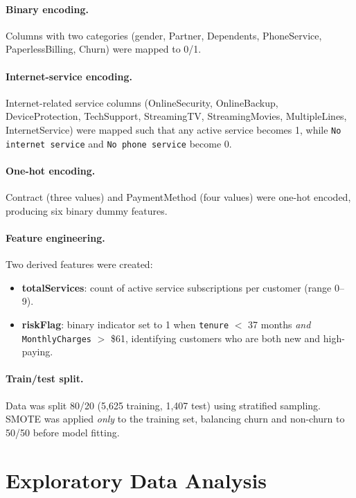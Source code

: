 \documentclass{article}
\begin{document}
\paragraph{Binary encoding.}
Columns with two categories (gender, Partner, Dependents, PhoneService,
PaperlessBilling, Churn) were mapped to 0/1.

\paragraph{Internet-service encoding.}
Internet-related service columns (OnlineSecurity, OnlineBackup,
DeviceProtection, TechSupport, StreamingTV, StreamingMovies, MultipleLines,
InternetService) were mapped such that any active service becomes 1, while
\texttt{No internet service} and \texttt{No phone service} become 0.

\paragraph{One-hot encoding.}
Contract (three values) and PaymentMethod (four values) were one-hot encoded,
producing six binary dummy features.

\paragraph{Feature engineering.}
Two derived features were created:
\begin{itemize}
  \item \textbf{totalServices}: count of active service subscriptions per
        customer (range 0--9).
  \item \textbf{riskFlag}: binary indicator set to 1 when
        \texttt{tenure} $<$ 37 months \emph{and}
        \texttt{MonthlyCharges} $>$ \$61, identifying customers who are
        both new and high-paying.
\end{itemize}

\paragraph{Train/test split.}
Data was split 80/20 (5,625 training, 1,407 test) using stratified sampling.
SMOTE was applied \emph{only} to the training set, balancing churn and
non-churn to 50/50 before model fitting.


\section{Exploratory Data Analysis}
\end{document}

